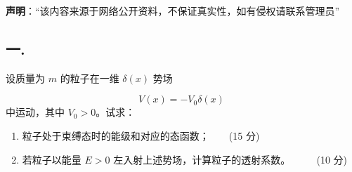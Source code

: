 
\textbf{声明}：“该内容来源于网络公开资料，不保证真实性，如有侵权请联系管理员”

\subsection{一.}
设质量为 $m$ 的粒子在一维 $\delta(x)$ 势场

\[
V(x) = -V_0 \delta(x)~
\]
中运动，其中 $V_0 > 0$。试求：

\begin{enumerate}
    \item 粒子处于束缚态时的能级和对应的态函数；$\qquad $(15 分)
    \item 若粒子以能量 $E > 0$ 左入射上述势场，计算粒子的透射系数。 $\qquad $ (10 分)
\end{enumerate}